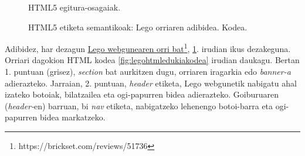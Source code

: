 \begin{figure}[ht]
	\centering
{}
\caption{HTML5 egitura-osagaiak.}
\label{fig:legohtml5etiketak}
\end{figure}

\begin{figure}[ht]
	\centering
{}
\caption{HTML5 etiketa semantikoak: Lego orriaren adibidea. Kodea.}
\label{fig:legohtml5etiketakkodea}
\end{figure}


Adibidez, har dezagun  \href{https://brickset.com/reviews/51736}{Lego webgunearen orri bat}\footnote{https://brickset.com/reviews/51736},  \ref{fig:legohtml5etiketak}. irudian ikus dezakeguna. Orriari dagokion HTML kodea  \ref{fig:legohtmledukiakodea} irudian daukagu. Bertan 1. puntuan (grisez), \textit{section} bat aurkitzen dugu, orriaren iragarkia edo \textit{banner-a} adierazteko. Jarraian, 2. puntuan, \textit{header} etiketa, Lego webgunetik nabigatu ahal izateko botoiak, bilatzailea eta ogi-papurren bidea adierazteko. Goiburuaren (\textit{header-}en) barruan, bi \textit{nav} etiketa, nabigatzeko lehenengo botoi-barra eta ogi-papurren bidea markatzeko.

